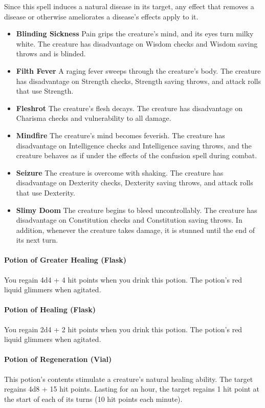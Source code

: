         Since this spell induces a natural disease in its target, any effect that removes a disease or otherwise ameliorates a disease's effects apply to it.

        \begin{itemize}
            \item \textbf{Blinding Sickness} Pain grips the creature's mind, and its eyes turn milky white.
            The creature has disadvantage on Wisdom checks and Wisdom saving throws and is blinded.
            \item \textbf{Filth Fever} A raging fever sweeps through the creature's body.
            The creature has disadvantage on Strength checks, Strength saving throws, and attack rolls that use Strength.
            \item \textbf{Fleshrot} The creature's flesh decays.
            The creature has disadvantage on Charisma checks and vulnerability to all damage.
            \item \textbf{Mindfire} The creature's mind becomes feverish.
            The creature has disadvantage on Intelligence checks and Intelligence saving throws, and the creature behaves as if under the effects of the confusion spell during combat.
            \item \textbf{Seizure} The creature is overcome with shaking.
            The creature has disadvantage on Dexterity checks, Dexterity saving throws, and attack rolls that use Dexterity.
            \item \textbf{Slimy Doom} The creature begins to bleed uncontrollably.
            The creature has disadvantage on Constitution checks and Constitution saving throws.
            In addition, whenever the creature takes damage, it is stunned until the end of its next turn.
        \end{itemize}
    \paragraph{Potion of Greater Healing (Flask)}
        You regain 4d4 + 4 hit points when you drink this potion.
        The potion's red liquid glimmers when agitated.
    \paragraph{Potion of Healing (Flask)}
        You regain 2d4 + 2 hit points when you drink this potion.
        The potion's red liquid glimmers when agitated.
    \paragraph{Potion of Regeneration (Vial)} %
        This potion's contents stimulate a creature's natural healing ability.
        The target regains 4d8 + 15 hit points.
        Lasting for an hour, the target regains 1 hit point at the start of each of its turns (10 hit points each minute).

